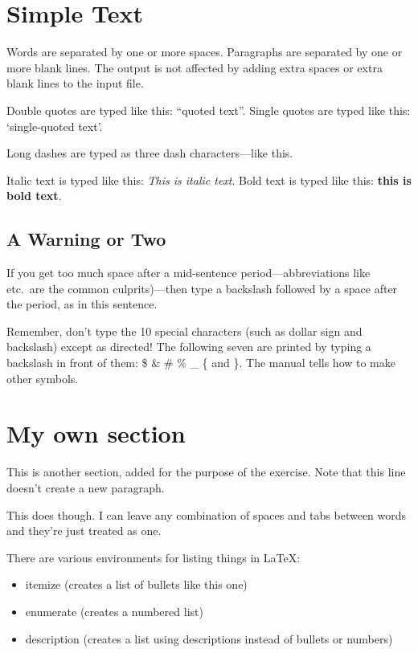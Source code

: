 \documentclass[a4paper,12pt]{article}  %
\begin{document}
\tableofcontents

\section{Simple Text}          %

Words are separated by one or    more      spaces.  Paragraphs are
    separated by one or more blank lines.  The output is not affected
by adding extra spaces or extra blank lines to the input file.


Double quotes are typed like this: ``quoted text''.
Single quotes are typed like this: `single-quoted text'.

Long dashes are typed as three dash characters---like this.

Italic text is typed like this: \textit{This is italic text}.
Bold   text is typed like this: \textbf{this is  bold  text}.

\subsection{A Warning or Two}        %

If you get too much space after a mid-sentence period---abbreviations
like etc.\ are the common culprits)---then type a backslash followed by
a space after the period, as in this sentence.

Remember, don't type the 10 special characters (such as dollar sign and
backslash) except as directed!  The following seven are printed by
typing a backslash in front of them:  \$  \&  \#  \%  \_  \{  and  \}.
The manual tells how to make other symbols.

\section{My own section}
This is another section, added for the purpose of the exercise.
Note that this line doesn't create a new paragraph.

This does though.	I can leave any  combination of spaces and tabs
between words and they're just treated as one.

There are various environments for listing things in \LaTeX{}:
\begin{itemize}
	\item itemize (creates a list of bullets like this one)
	\item enumerate (creates a numbered list)
	\item description (creates a list using descriptions instead of bullets or numbers)
\end{itemize}
\end{document}
